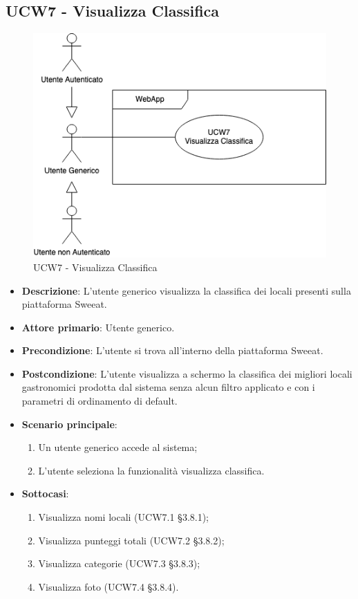\subsection{UCW7 - Visualizza Classifica}
\begin{figure}[!h]
\centering
\includegraphics[scale=0.5]{UC_images/UCW7.png}
\caption{UCW7 - Visualizza Classifica}
\end{figure}
\begin{center}
\end{center}
\begin{itemize}
	\item \textbf{Descrizione}: L'utente generico visualizza la classifica dei locali presenti sulla piattaforma Sweeat.
    \item \textbf{Attore primario}: Utente generico.
    \item \textbf{Precondizione}: L’utente si trova all’interno della piattaforma Sweeat.
    \item \textbf{Postcondizione}: L’utente visualizza a schermo la classifica dei migliori locali gastronomici prodotta dal sistema senza alcun filtro applicato e con i parametri di ordinamento di default.
    \item \textbf{Scenario principale}: 
    \begin{enumerate}
        \item Un utente generico accede al sistema;
        \item L’utente seleziona la funzionalità visualizza classifica.
    \end{enumerate}
    \item \textbf{Sottocasi}:
    \begin{enumerate}
        \item Visualizza nomi locali (UCW7.1 §3.8.1);
        \item Visualizza punteggi totali (UCW7.2 §3.8.2);
        \item Visualizza categorie (UCW7.3 §3.8.3);
        \item Visualizza foto (UCW7.4 §3.8.4).
    \end{enumerate}
\end{itemize}

